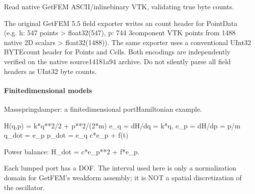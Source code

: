 \documentclass[letterpaper,10pt,english]{sphinxmanual}
\begin{document}
\begin{fulllineitems}

\pysigstartsignatures
\pysiglinewithargsret
{}
{\sphinxparamcomma {}\sphinxparamcomma {}}
{}
\pysigstopsignatures
\sphinxAtStartPar
Read native GetFEM ASCII/inline\sphinxhyphen{}binary VTK, validating true byte counts.

\sphinxAtStartPar
The original GetFEM 5.5 field exporter writes an 
count header for PointData (e.g. h: 547 points \sphinxhyphen{}\textgreater{} float32(547),
p: 744 3\sphinxhyphen{}component VTK points from 1488 native 2D scalars \sphinxhyphen{}\textgreater{}
float32(1488)). The same exporter uses a conventional UInt32
BYTE\sphinxhyphen{}count header for Points and Cells. Both encodings are
independently verified on the native source\sphinxhyphen{}14181a94 archive.
Do not silently parse all field headers as UInt32 byte counts.

\end{fulllineitems}



\paragraph{Finite\sphinxhyphen{}dimensional models}
\label{\detokenize{scrimp.examples:finite-dimensional-models}}
\sphinxAtStartPar
Mass\textendash{}spring\textendash{}damper: a finite\sphinxhyphen{}dimensional port\sphinxhyphen{}Hamiltonian example.
\begin{description}
\sphinxAtStartPar
H(q,p) = k*q**2/2 + p**2/(2*m)
e\_q = dH/dq = k*q,  e\_p = dH/dp = p/m
q\_dot = e\_p
p\_dot = \sphinxhyphen{}e\_q \sphinxhyphen{} c*e\_p + f(t)

\end{description}

\sphinxAtStartPar
Power balance: H\_dot = \sphinxhyphen{}c*e\_p**2 + f*e\_p.

\sphinxAtStartPar
Each lumped port has a  DOF. The interval used here is only
a normalization domain for GetFEM’s weak\sphinxhyphen{}form assembly; it is NOT a
spatial discretization of the oscillator.
\end{document}
